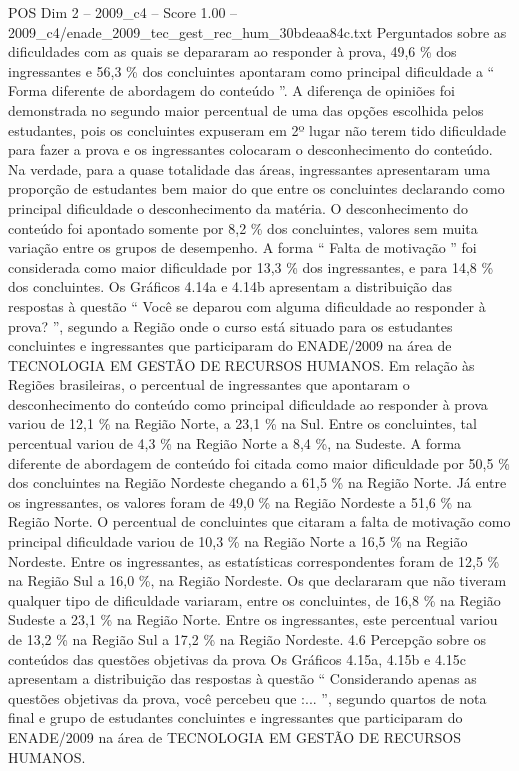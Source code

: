 \begin{textsample}{POS Dim 2 – 2009\_c4 – Score 1.00 – 2009\_c4/enade\_2009\_tec\_gest\_rec\_hum\_30bdeaa84c.txt}
Perguntados sobre as dificuldades com as quais se depararam ao responder à prova, 49,6 \% dos ingressantes e 56,3 \% dos concluintes apontaram como principal dificuldade a “ Forma diferente de abordagem do conteúdo ”.
A diferença de opiniões foi demonstrada no segundo maior percentual de uma das opções escolhida pelos estudantes, pois os concluintes expuseram em 2º lugar não terem tido dificuldade para fazer a prova e os ingressantes colocaram o desconhecimento do conteúdo.
Na verdade, para a quase totalidade das áreas, ingressantes apresentaram uma proporção de estudantes bem maior do que entre os concluintes declarando como principal dificuldade o desconhecimento da matéria.
O desconhecimento do conteúdo foi apontado somente por 8,2 \% dos concluintes, valores sem muita variação entre os grupos de desempenho.
A forma “ Falta de motivação ” foi considerada como maior dificuldade por 13,3 \% dos ingressantes, e para 14,8 \% dos concluintes.
Os Gráficos 4.14a e 4.14b apresentam a distribuição das respostas à questão “ Você se deparou com alguma dificuldade ao responder à prova? ”, segundo a Região onde o curso está situado para os estudantes concluintes e ingressantes que participaram do ENADE/2009 na área de TECNOLOGIA EM GESTÃO DE RECURSOS HUMANOS.
Em relação às Regiões brasileiras, o percentual de ingressantes que apontaram o desconhecimento do conteúdo como principal dificuldade ao responder à prova variou de 12,1 \% na Região Norte, a 23,1 \% na Sul.
Entre os concluintes, tal percentual variou de 4,3 \% na Região Norte a 8,4 \%, na Sudeste.
A forma diferente de abordagem de conteúdo foi citada como maior dificuldade por 50,5 \% dos concluintes na Região Nordeste chegando a 61,5 \% na Região Norte.
Já entre os ingressantes, os valores foram de 49,0 \% na Região Nordeste a 51,6 \% na Região Norte.
O percentual de concluintes que citaram a falta de motivação como principal dificuldade variou de 10,3 \% na Região Norte a 16,5 \% na Região Nordeste.
Entre os ingressantes, as estatísticas correspondentes foram de 12,5 \% na Região Sul a 16,0 \%, na Região Nordeste.
Os que declararam que não tiveram qualquer tipo de dificuldade variaram, entre os concluintes, de 16,8 \% na Região Sudeste a 23,1 \% na Região Norte.
Entre os ingressantes, este percentual variou de 13,2 \% na Região Sul a 17,2 \% na Região Nordeste. 4.6 Percepção sobre os conteúdos das questões objetivas da prova Os Gráficos 4.15a, 4.15b e 4.15c apresentam a distribuição das respostas à questão “ Considerando apenas as questões objetivas da prova, você percebeu que :... ”, segundo quartos de nota final e grupo de estudantes concluintes e ingressantes que participaram do ENADE/2009 na área de TECNOLOGIA EM GESTÃO DE RECURSOS HUMANOS.

\end{textsample}
